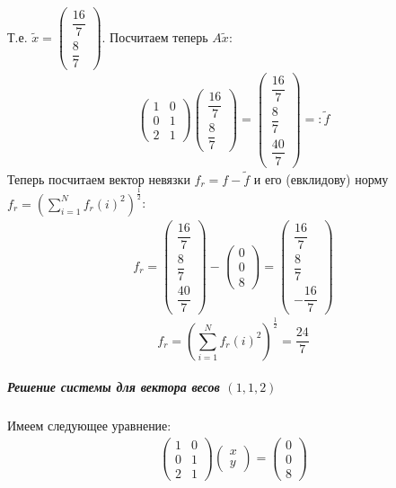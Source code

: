 \documentclass[11pt,a4paper]{report}
\begin{document}
Т.е. $\tilde{x} = \begin{pmatrix} \dfrac{16}{7}\\[2ex]\dfrac{8}{7} \end{pmatrix}$. Посчитаем теперь $A\tilde{x}$:
\begin{gather*}
\begin{pmatrix} 1&0\\0&1\\2&1 \end{pmatrix}\begin{pmatrix} \dfrac{16}{7}\\[2ex]\dfrac{8}{7} \end{pmatrix}=\begin{pmatrix} \dfrac{16}{7}\\[2ex]\dfrac{8}{7}\\[2ex]\dfrac{40}{7} \end{pmatrix} =: \tilde{f}
\end{gather*}
Теперь посчитаем вектор невязки $f_r = f - \tilde{f}$ и его (евклидову) норму $f_r = (\sum_{i=1}^{N} f_r(i)^2)^{\frac{1}{2}}$:
\begin{gather*}
f_r =  \begin{pmatrix} \dfrac{16}{7}\\[2ex]\dfrac{8}{7}\\[2ex]\dfrac{40}{7} \end{pmatrix} - \begin{pmatrix} 0\\0\\8 \end{pmatrix} = \begin{pmatrix} \dfrac{16}{7}\\[2ex]\dfrac{8}{7}\\[2ex]-\dfrac{16}{7} \end{pmatrix}
\end{gather*}
\[
f_r = (\sum_{i=1}^{N} f_r(i)^2)^{\frac{1}{2}} = \frac{24}{7}
\]
\subparagraph{Решение системы для вектора весов $(1,1,2)$} 
Имеем следующее уравнение:
\begin{gather*}
\begin{pmatrix} 1&0\\0&1\\2&1 \end{pmatrix}\begin{pmatrix} x\\y \end{pmatrix}=\begin{pmatrix} 0\\0\\8 \end{pmatrix}
\end{gather*}
\end{document}
